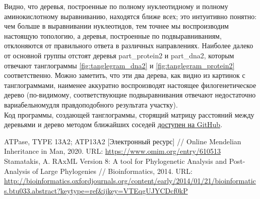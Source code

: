 \documentclass[a4paper,12pt]{article} %
\begin{document}
	Видно, что деревья, построенные по полному нуклеотидному и полному аминокислотному выравниванию, находятся ближе всех; это  интуитивно понятно: чем больше в выравнивании нуклеотидов, тем точнее мы воспроизводим настоящую топологию, а деревья, построенные по подвыравниваниям, отклоняются от правильного ответа в различных направлениях. Наиболее далеко от основной группы отстоят деревья part\_protein2 и part\_dna2, которым отвечают танглограммы 
	\ref{fig:tanglegram_dna2} и \ref{fig:tanglegram_protein2} соответственно. Можно заметить, что эти два дерева, как видно из картинок с танглограммами, наименее аккуратно воспроизводят настоящее филогенетическое дерево (по-видимому, соответствующие подвыравнивания отвечают недостаточно вариабельномудля правдоподобного результата участку).\\
	
	Код программы, создающей танглограммы, сторящий матрицу расстояний между деревьями и дерево методом ближайших соседей \href{https://github.com/zuevval/source/blob/master/python/bioinf_practice/needles/tanglegram.R}{доступен на GitHub}.
	
	\newpage
	\begin{thebibliography}{99}
		 ATPase, TYPE 13A2; ATP13A2 [Электронный ресурс] // Online Mendelian Inheritance in Man, 2020. URL: \url{https://www.omim.org/entry/610513}
		 Stamatakis, A. RAxML Version 8: A tool for Phylogenetic Analysis and Post-Analysis of Large Phylogenies // Bioinformatics, 2014. URL:
		\url{http://bioinformatics.oxfordjournals.org/content/early/2014/01/21/bioinformatics.btu033.abstract?keytype=ref&ijkey=VTEqgUJYCDcf0kP}
	\end{thebibliography}

	\newpage
			
		
\end{document}
